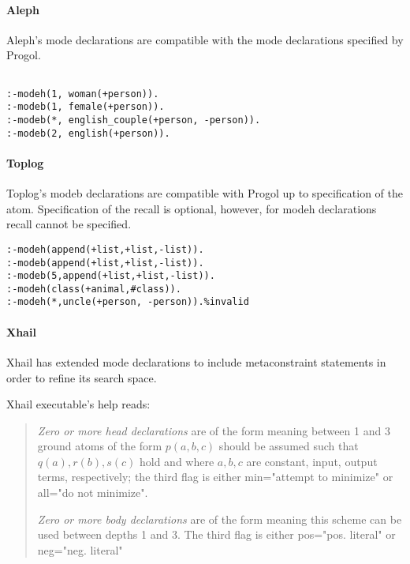\paragraph{Aleph}
Aleph's mode declarations are compatible\cite{aleph2007} with the mode declarations specified by Progol.
\begin{exmp}
\begin{lstlisting}

:-modeh(1, woman(+person)).
:-modeb(1, female(+person)).
:-modeb(*, english_couple(+person, -person)).
:-modeb(2, english(+person)).
\end{lstlisting}
\end{exmp}

\paragraph{Toplog}
Toplog's modeb declarations are compatible with Progol up to specification of the atom. Specification of the recall is optional, however, for modeh declarations recall cannot be specified\cite{santos2008toplogWebsite}.
\begin{exmp}\cite{santos2008toplogWebsite}
\begin{lstlisting}
:-modeh(append(+list,+list,-list)).
:-modeb(append(+list,+list,-list)).
:-modeb(5,append(+list,+list,-list)).
:-modeh(class(+animal,#class)).
:-modeh(*,uncle(+person, -person)).%invalid
\end{lstlisting}
\end{exmp}

\paragraph{Xhail}\label{xhail_mode_declarations}
Xhail has extended mode declarations to include metaconstraint statements in order to refine its search space.

Xhail executable's help\cite{ray2007xhail} reads:
\begin{quote}
\emph{Zero or more head declarations} are of the form
 meaning between 1 and 3 ground atoms
 of the form $p(a,b,c)$ should be assumed such that $q(a), r(b), s(c)$ hold 
 and where $a, b, c$ are constant, input, output terms, respectively;
 the third flag is either min="attempt to minimize" or all="do not minimize".
 
\emph{Zero or more body declarations} are of the form  meaning this scheme can be used between 
 depths 1 and 3.  The third flag is either pos="pos. literal" or neg="neg. literal" 
\end{quote}

